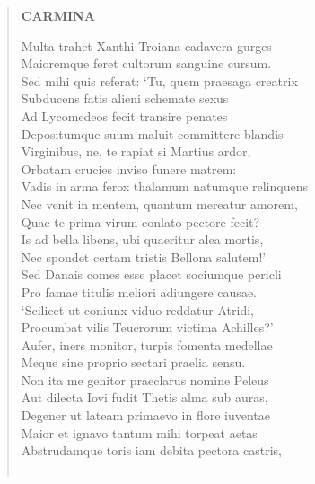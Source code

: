 \documentclass[11pt, a4paper]{report}
\begin{document}
\begin{verse}
    \begin{center} \textbf{CARMINA} \end{center} \marginpar{[164]} Multa trahet Xanthi Troiana cadavera gurges \\ Maioremque feret cultorum sanguine cursum. \\ Sed mihi quis referat: ‘Tu, quem praesaga creatrix \\ Subducens fatis alieni schemate sexus \\ Ad Lycomedeos fecit transire penates \\ Depositumque suum maluit committere blandis \\ Virginibus, ne, te rapiat si Martius ardor, \\ Orbatam crucies inviso funere matrem: \\ Vadis in arma ferox thalamum natumque relinquens \\ Nec venit in mentem, quantum mereatur amorem, \\ Quae te prima virum conlato pectore fecit? \\ Is ad bella libens, ubi quaeritur alea mortis, \\ Nec spondet certam tristis Bellona salutem!’ \\ Sed Danais comes esse placet sociumque pericli \\ Pro famae titulis meliori adiungere causae. \\ ‘Scilicet ut coniunx viduo reddatur Atridi, \\ Procumbat vilis Teucrorum victima Achilles?’ \\ Aufer, iners monitor, turpis fomenta medellae \\ Meque sine proprio sectari praelia sensu. \\ Non ita me genitor praeclarus nomine Peleus \\ Aut dilecta Iovi fudit Thetis alma sub auras, \\ Degener ut lateam primaevo in flore iuventae \\ Maior et ignavo tantum mihi torpeat aetas \\ Abstrudamque toris iam debita pectora castris, \\ 
        ﻿\pagebreak 

\end{verse}
\end{document}
